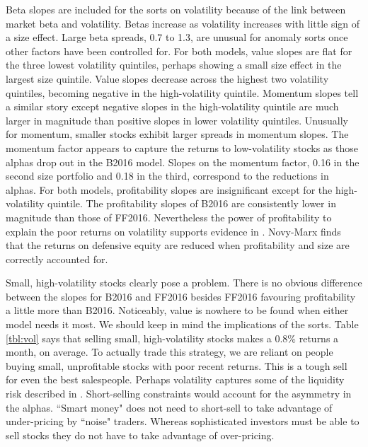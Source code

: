 Beta slopes are included for the sorts on volatility because of the link between market
beta and volatility. Betas increase as volatility increases with little sign of a size
effect. Large beta spreads, 0.7 to 1.3, are unusual for anomaly sorts once other factors
have been controlled for. For both models, value slopes are flat for the three lowest
volatility quintiles, perhaps showing a small size effect in the largest size quintile.
Value slopes decrease across the highest two volatility quintiles, becoming negative in
the high-volatility quintile. Momentum slopes tell a similar story except negative slopes
in the high-volatility quintile are much larger in magnitude than positive slopes in lower
volatility quintiles. Unusually for momentum, smaller stocks exhibit larger spreads in
momentum slopes. The momentum factor appears to capture the returns to low-volatility
stocks as those alphas drop out in the B2016 model. Slopes on the momentum factor, 0.16 in
the second size portfolio and 0.18 in the third, correspond to the reductions in alphas.
For both models, profitability slopes are insignificant except for the high-volatility
quintile. The profitability slopes of B2016 are consistently lower in magnitude than those
of FF2016. Nevertheless the power of profitability to explain the poor returns on
volatility supports evidence in \textcite{novy2014understanding}. Novy-Marx finds that the
returns on defensive equity are reduced when profitability and size are correctly
accounted for.

Small, high-volatility stocks clearly pose a problem. There is no obvious difference
between the slopes for B2016 and FF2016 besides FF2016 favouring profitability a little
more than B2016. Noticeably, value is nowhere to be found when either model needs it most.
We should keep in mind the implications of the sorts. Table \ref{tbl:vol} says that
selling small, high-volatility stocks makes a 0.8\% returns a month, on average. To
actually trade this strategy, we are reliant on people buying small, unprofitable stocks
with poor recent returns. This is a tough sell for even the best salespeople. Perhaps
volatility captures some of the liquidity risk described in \textcite{nagel2005short}.
Short-selling constraints would account for the asymmetry in the alphas. ``Smart money"
does not need to short-sell to take advantage of under-pricing by ``noise" traders.
Whereas sophisticated investors must be able to sell stocks they do not have to take
advantage of over-pricing.
